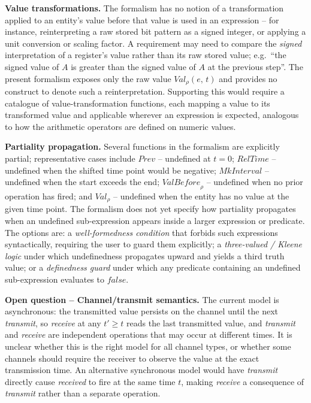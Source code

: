 \textbf{Value transformations.} The formalism has no notion of a transformation applied to an entity's value before that value is used in an expression -- for instance, reinterpreting a raw stored bit pattern as a signed integer, or applying a unit conversion or scaling factor. A requirement may need to compare the \emph{signed} interpretation of a register's value rather than its raw stored value; e.g.\ ``the signed value of $A$ is greater than the signed value of $A$ at the previous step''. The present formalism exposes only the raw value $\mathit{Val}_\rho(e,\, t)$ and provides no construct to denote such a reinterpretation. Supporting this would require a catalogue of value-transformation functions, each mapping a value to its transformed value and applicable wherever an expression is expected, analogous to how the arithmetic operators are defined on numeric values.

\textbf{Partiality propagation.} Several functions in the formalism are explicitly partial; representative cases include $\mathit{Prev}$ -- undefined at $t = 0$; $\mathit{RelTime}$ -- undefined when the shifted time point would be negative; $\mathit{MkInterval}$ -- undefined when the start exceeds the end; $\mathit{ValBefore}_\rho$ -- undefined when no prior operation has fired; and $\mathit{Val}_\rho$ -- undefined when the entity has no value at the given time point. The formalism does not yet specify how partiality propagates when an undefined sub-expression appears inside a larger expression or predicate. The options are: a \emph{well-formedness condition} that forbids such expressions syntactically, requiring the user to guard them explicitly; a \emph{three-valued / Kleene logic} under which undefinedness propagates upward and yields a third truth value; or a \emph{definedness guard} under which any predicate containing an undefined sub-expression evaluates to $\mathit{false}$.

\textbf{Open question -- Channel/transmit semantics.} The current model is asynchronous: the transmitted value persists on the channel until the next \textit{transmit}, so \textit{receive} at any $t' \geq t$ reads the last transmitted value, and \textit{transmit} and \textit{receive} are independent operations that may occur at different times. It is unclear whether this is the right model for all channel types, or whether some channels should require the receiver to observe the value at the exact transmission time. An alternative synchronous model would have \textit{transmit} directly cause \textit{received} to fire at the same time $t$, making \textit{receive} a consequence of \textit{transmit} rather than a separate operation.

